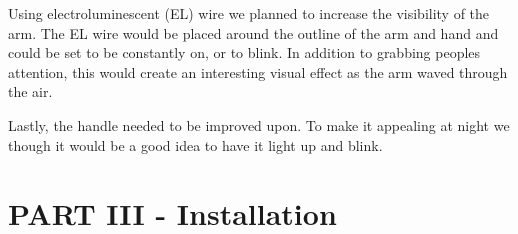 \documentclass[11pt]{report}
\begin{document}
Using electroluminescent (EL) wire we planned to increase the visibility of the arm. The EL wire would be placed around the outline of the arm and hand and could be set to be constantly on, or to blink. In addition to grabbing peoples attention, this would create an interesting visual effect as the arm waved through the air.

Lastly, the handle needed to be improved upon. To make it appealing at night we though it would be a good idea to have it light up and blink.



\clearpage
\section*{PART III - Installation}
\end{document}
